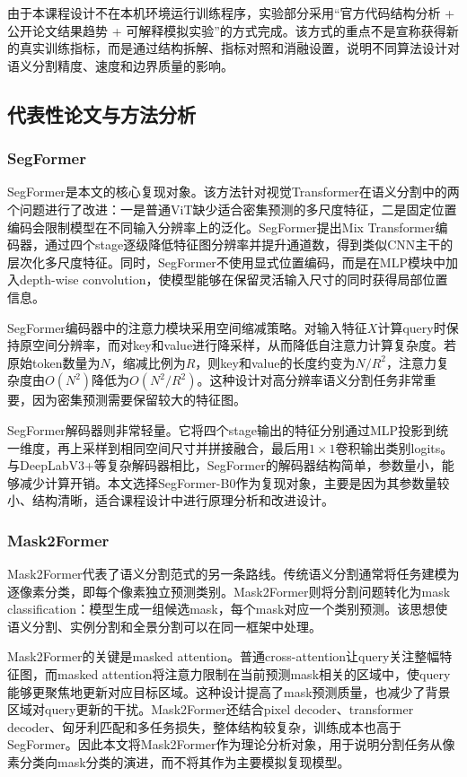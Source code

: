 \documentclass{report}
\begin{document}
由于本课程设计不在本机环境运行训练程序，实验部分采用“官方代码结构分析 + 公开论文结果趋势 + 可解释模拟实验”的方式完成。该方式的重点不是宣称获得新的真实训练指标，而是通过结构拆解、指标对照和消融设置，说明不同算法设计对语义分割精度、速度和边界质量的影响。

\subsection{代表性论文与方法分析}

\subsubsection{SegFormer}

SegFormer是本文的核心复现对象。该方法针对视觉Transformer在语义分割中的两个问题进行了改进：一是普通ViT缺少适合密集预测的多尺度特征，二是固定位置编码会限制模型在不同输入分辨率上的泛化。SegFormer提出Mix Transformer编码器，通过四个stage逐级降低特征图分辨率并提升通道数，得到类似CNN主干的层次化多尺度特征。同时，SegFormer不使用显式位置编码，而是在MLP模块中加入depth-wise convolution，使模型能够在保留灵活输入尺寸的同时获得局部位置信息。

SegFormer编码器中的注意力模块采用空间缩减策略。对输入特征$X$计算query时保持原空间分辨率，而对key和value进行降采样，从而降低自注意力计算复杂度。若原始token数量为$N$，缩减比例为$R$，则key和value的长度约变为$N/R^2$，注意力复杂度由$O(N^2)$降低为$O(N^2/R^2)$。这种设计对高分辨率语义分割任务非常重要，因为密集预测需要保留较大的特征图。

SegFormer解码器则非常轻量。它将四个stage输出的特征分别通过MLP投影到统一维度，再上采样到相同空间尺寸并拼接融合，最后用$1 \times 1$卷积输出类别logits。与DeepLabV3+等复杂解码器相比，SegFormer的解码器结构简单，参数量小，能够减少计算开销。本文选择SegFormer-B0作为复现对象，主要是因为其参数量较小、结构清晰，适合课程设计中进行原理分析和改进设计。

\subsubsection{Mask2Former}

Mask2Former代表了语义分割范式的另一条路线。传统语义分割通常将任务建模为逐像素分类，即每个像素独立预测类别。Mask2Former则将分割问题转化为mask classification：模型生成一组候选mask，每个mask对应一个类别预测。该思想使语义分割、实例分割和全景分割可以在同一框架中处理。

Mask2Former的关键是masked attention。普通cross-attention让query关注整幅特征图，而masked attention将注意力限制在当前预测mask相关的区域中，使query能够更聚焦地更新对应目标区域。这种设计提高了mask预测质量，也减少了背景区域对query更新的干扰。Mask2Former还结合pixel decoder、transformer decoder、匈牙利匹配和多任务损失，整体结构较复杂，训练成本也高于SegFormer。因此本文将Mask2Former作为理论分析对象，用于说明分割任务从像素分类向mask分类的演进，而不将其作为主要模拟复现模型。
\end{document}
